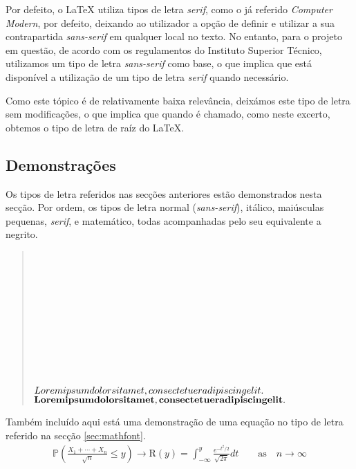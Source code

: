 \documentclass{../ist-thesis}
\begin{document}
Por defeito, o \LaTeX{} utiliza tipos de letra \textit{serif}, como o já referido \textit{Computer Modern}, por defeito, deixando ao utilizador a opção de definir e utilizar a sua contrapartida \textit{sans-serif} em qualquer local no texto. No entanto, para o projeto em questão, de acordo com os regulamentos do Instituto Superior Técnico, utilizamos um tipo de letra \textit{sans-serif} como base, o que implica que está disponível a utilização de um tipo de letra \textit{serif} quando necessário.

Como este tópico é de relativamente baixa relevância, deixámos este tipo de letra sem modificações, o que implica que quando é chamado, \textrm{como neste excerto}, obtemos o tipo de letra de raíz do \LaTeX{}.

\subsection{Demonstrações}

Os tipos de letra referidos nas secções anteriores estão demonstrados nesta secção. Por ordem, os tipos de letra normal (\textit{sans-serif}), itálico, maiúsculas pequenas, \textit{serif}, e matemático, todas acompanhadas pelo seu equivalente a negrito.

\newrobustcmd*{}
\begin{quote}
	\textsample \\
	{\bfseries\textsample} \\
	{\itshape\textsample} \\
	{\bfseries\itshape\textsample} \\
	{\scshape\textsample} \\
	{\bfseries\scshape\textsample} \\
	{\ttfamily\textsample} \\
	{\bfseries\ttfamily\textsample} \\
	{\rmfamily\textsample} \\
	{\bfseries\rmfamily\textsample} \\
	{$Lorem ipsum dolor sit amet, consectetuer adipiscing elit.$} \\
	{$\mathbf{Lorem ipsum dolor sit amet, consectetuer adipiscing elit.}$} \\
\end{quote}

Também incluído aqui está uma demonstração de uma equação no tipo de letra  referido na secção \ref{sec:mathfont}.
\begin{gather*}
	\mathbb{P}\left(\frac{X_1 + \cdots + X_n}{\sqrt{n}} \leq y\right) \rightarrow \mathrm{R}(y) = \int_{-\infty}^{y} \frac{e^{-t^2/2}}{\sqrt{2\pi}}dt \qquad \mathrm{as} \quad n \rightarrow \infty
\end{gather*}
\end{document}
